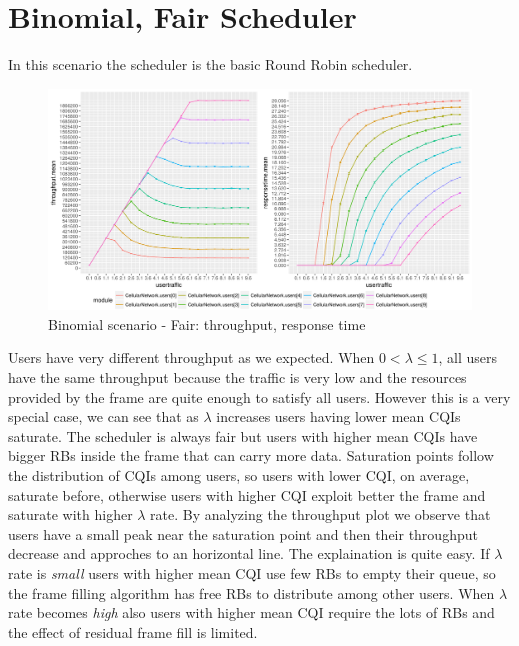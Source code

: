 \section{Binomial, Fair Scheduler}
In this scenario the scheduler is the basic Round Robin scheduler.

\begin{figure}[H]
  \includegraphics[width=1\textwidth]{images/all-binom}
  \caption{Binomial scenario - Fair: throughput, response time}
  \label{fig:Binomial scenario - Fair: throughput, response time}
\end{figure}
Users have very different throughput as we expected. When \( 0 < \lambda \leq 1\), all users have the same throughput because the traffic is very low and the resources provided by the frame are quite enough to satisfy all users. However this is a very special case, we can see that as \(\lambda\) increases users having lower mean CQIs saturate. The scheduler is always fair but users with higher mean CQIs have bigger RBs inside the frame that can carry more data. Saturation points follow the distribution of CQIs among users, so users with lower CQI, on average, saturate before, otherwise users with higher CQI exploit better the frame and saturate with higher \(\lambda\) rate. 
By analyzing the throughput plot we observe that users have a small peak near the saturation point and then their throughput decrease and approches to an horizontal line. The explaination is quite easy. If \(\lambda\) rate is \textit{small} users with higher mean CQI use few RBs to empty their queue, so the frame filling algorithm has free RBs to distribute among other users. When \(\lambda\) rate becomes \textit{high} also users with higher mean CQI require the lots of RBs and the effect of residual frame fill is limited. 

